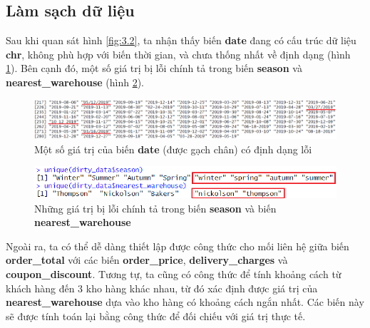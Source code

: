 \subsection{Làm sạch dữ liệu}
Sau khi quan sát hình \ref{fig:3.2}, ta nhận thấy biến \textbf{date} đang có cấu trúc dữ liệu \textbf{chr}, không phù hợp với biến thời gian, và chưa thống nhất về định dạng (hình \ref{fig:3.3}). Bên cạnh đó, một số giá trị bị lỗi chính tả trong biến \textbf{season} và \textbf{nearest\_warehouse} (hình \ref{fig:3.4}).
\begin{figure}[!htbp]
    \centering
    \includegraphics[width=1\textwidth]{graphics/Pre_processing_data/f10.PNG}
    \caption{Một số giá trị của biến \textbf{date} (được gạch chân) có định dạng lỗi}
    \label{fig:3.3}
\end{figure}

\begin{figure}[!htbp]
    \centering
    \includegraphics[width=\textwidth]{graphics/Pre_processing_data/f11.PNG}
    \caption{Những giá trị bị lỗi chính tả trong biến \textbf{season} và biến \textbf{nearest\_warehouse}}
    \label{fig:3.4}
\end{figure}

Ngoài ra, ta có thể dễ dàng thiết lập được công thức cho mối liên hệ giữa biến \textbf{order\_total} với các biến \textbf{order\_price}, \textbf{delivery\_charges} và \textbf{coupon\_discount}. Tương tự, ta cũng có công thức để tính khoảng cách từ khách hàng đến 3 kho hàng khác nhau, từ đó xác định được giá trị của \textbf{nearest\_warehouse} dựa vào kho hàng có khoảng cách ngắn nhất. Các biến này sẽ được tính toán lại bằng công thức để đối chiếu với giá trị thực tế.
